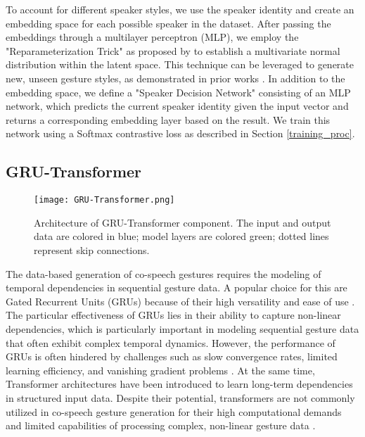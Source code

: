 \documentclass[sigconf]{acmart}
\begin{document}
To account for different speaker styles, we use the speaker identity  and create an embedding space for each possible speaker in the dataset. After passing the embeddings through a multilayer perceptron (MLP), we employ the "Reparameterization Trick" as proposed by \citet{kingma2013auto} to establish a multivariate normal distribution within the latent space. This technique can be leveraged to generate new, unseen gesture styles, as demonstrated in prior works  \citep{ahujaStyleTransferCoSpeech2020,ghorbani2022exemplar}.
In addition to the embedding space, we define a "Speaker Decision Network" consisting of an MLP network, which predicts the current speaker identity  given the input vector  and returns a corresponding embedding layer based on the result. We train this network using a Softmax contrastive loss as described in Section \ref{training_proc}.


\subsection{GRU-Transformer}

\begin{figure}[b]
  \centering
  \texttt{[image: GRU-Transformer.png]}
  \caption{Architecture of GRU-Transformer component. The input and output data are colored in blue; model layers are colored green; dotted lines represent skip connections.}
  \label{fig:gesture_gru_transformer}
\end{figure}

The data-based generation of co-speech gestures requires the modeling of temporal dependencies in sequential gesture data. A popular choice for this are Gated Recurrent Units (GRUs) \cite{cho2014learning} because of their high versatility and ease of use \cite{yoonSpeechGestureGeneration2020,liangSEEGSemanticEnergized2022,liuLearningHierarchicalCrossModal2022a,aoRhythmicGesticulatorRhythmAware2022a}. The particular effectiveness of GRUs lies in their ability to capture non-linear dependencies, which is particularly important in modeling sequential gesture data that often exhibit complex temporal dynamics. However, the performance of GRUs is often hindered by challenges such as slow convergence rates, limited learning efficiency, and vanishing gradient problems \cite{wang2019ogru}. At the same time, Transformer architectures \cite{vaswani2017attention} have been introduced to learn long-term dependencies in structured input data. Despite their potential, transformers are not commonly utilized in co-speech gesture generation for their high computational demands and limited capabilities of processing complex, non-linear gesture data \cite{ahuja2020no,bhattacharya2021text2gestures,zhuang2022text}. 
\end{document}
